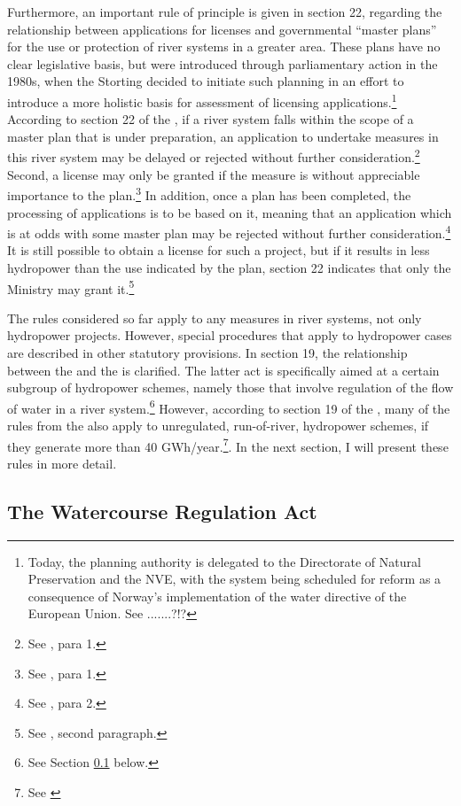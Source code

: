Furthermore, an important rule of principle is given in section 22, regarding the relationship between applications for licenses and governmental ``master plans'' for the use or protection of river systems in a greater area. These plans have no clear legislative basis, but were introduced through parliamentary action in the 1980s, when the Storting decided to initiate such planning in an effort to introduce a more holistic basis for assessment of licensing applications.\footnote{Today, the planning authority is delegated to the Directorate of Natural Preservation and the NVE, with the system being scheduled for reform as a consequence of Norway's implementation of the water directive of the European Union. See .......?!?} According to section 22 of the \cite{wra00}, if a river system falls within the scope of a master plan that is under preparation, an application to undertake measures in this river system may be delayed or rejected without further consideration.\footnote{See \cite[22]{wra00}, para 1.} Second, a license may only be granted if the measure is without appreciable importance to the plan.\footnote{See \cite[22]{wra00}, para 1.} In addition, once a plan has been completed, the processing of applications is to be based on it, meaning that an application which is at odds with some master plan may be rejected without further consideration.\footnote{See \cite[22]{wra00}, para 2.} It is still possible to obtain a license for such a project, but if it results in less hydropower than the use indicated by the plan, section 22 indicates that only the Ministry may grant it.\footnote{See \cite[22]{wra00}, second paragraph.}

The rules considered so far apply to any measures in river systems, not only hydropower projects. However, special procedures that apply to hydropower cases are described in other statutory provisions. In section 19, the relationship between the \cite{wra00} and the \cite{wra00} is clarified. The latter act is specifically aimed at a certain subgroup of hydropower schemes, namely those that involve regulation of the flow of water in a river system.\footnote{See Section \ref{sec:wra17} below.} However, according to section 19 of the \cite{wra00}, many of the rules from the \cite{wra17} also apply to unregulated, run-of-river, hydropower schemes, if they generate more than 40 GWh/year.\footnote{See \cite[19]{wra00}}. In the next section, I will present these rules in more detail.

\subsection{The Watercourse Regulation Act}\label{sec:wra17}


